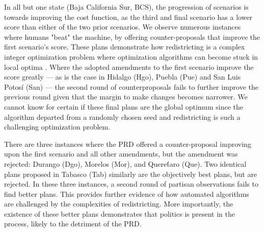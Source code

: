 \documentclass[letter,12pt]{article}
\begin{document}
In all but one state (Baja California Sur, BCS), the progression of scenarios is towards improving the cost function, as the third and final scenario has a lower score than either of the two prior scenarios. We observe numerous instances where humans "beat" the machine, by offering counter-proposals that improve the first scenario's score. These plans demonstrate how redistricting is a complex integer optimization problem where optimization algorithms can become stuck in local optima \citep{altman.mcdonald2011bard}. Where the adopted amendments to the first scenario improve the score greatly --- as is the case in Hidalgo (Hgo), Puebla (Pue) and San Luis Potos\'i (San) --- the second round of counterproposals fails to further improve the previous round given that the margin to make changes becomes narrower. We cannot know for certain if these final plans are the global optimum since the algorithm departed from a randomly chosen seed and redistricting is such a challenging optimization problem.



There are three instances where the PRD offered a counter-proposal improving upon the first scenario and all other amendments, but the amendment was rejected: Durango (Dgo), Morelos (Mor), and Quere\'taro (Que). Two identical plans proposed in Tabasco (Tab) similarly are the objectively best plans, but are rejected. In these three instances, a second round of partisan observations fails to find better plans. This provides further evidence of how automated algorithms are challenged by the complexities of redistricting. More importantly, the existence of these better plans demonstrates that politics is present in the process, likely to the detriment of the PRD.   


\end{document}
